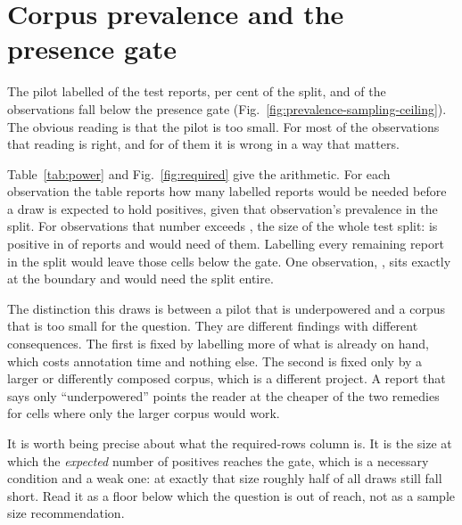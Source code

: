 \section{Corpus prevalence and the presence gate}

The pilot labelled \NCohort{} of the \NTest{} test reports, \CoveragePct{} per
cent of the split, and \NUnderpowered{} of the \NFindings{} observations fall
below the presence gate (Fig.~\ref{fig:prevalence-sampling-ceiling}). The
obvious reading is that the pilot is too small. For most of the observations
that reading is right, and for \NExceedSplit{} of them it is wrong in a way
that matters.

Table~\ref{tab:power} and Fig.~\ref{fig:required} give the arithmetic. For each
observation the table reports how many labelled reports would be needed before
a draw is expected to hold \MinPresent{} positives, given that observation's
prevalence in the split. For \NExceedSplit{} observations that number exceeds
\NTest{}, the size of the whole test split: \RarestFinding{} is positive in
\RarestPresent{} of \NTest{} reports and would need \RarestRequired{} of them.
Labelling every remaining report in the split would leave those cells below
the gate. One observation, \BoundaryFinding{}, sits exactly at the boundary and
would need the split entire.

The distinction this draws is between a pilot that is underpowered and a corpus
that is too small for the question. They are different findings with different
consequences. The first is fixed by labelling more of what is already on hand,
which costs annotation time and nothing else. The second is fixed only by a
larger or differently composed corpus, which is a different project. A report
that says only ``underpowered'' points the reader at the cheaper of the two
remedies for cells where only the larger corpus would work.

It is worth being precise about what the required-rows column is. It is the
size at which the \emph{expected} number of positives reaches the gate, which
is a necessary condition and a weak one: at exactly that size roughly half of
all draws still fall short. Read it as a floor below which the question is out
of reach, not as a sample size recommendation.

\begin{table}[tbp]
\centering
\caption{What the frozen test split of \NTest{} reports contains for each of the
\NFindings{} labelled observations, and what a subsample would need. Rows
needed for the gate is the smallest draw whose expected number of gold
positives reaches \MinPresent{}, computed from that observation's prevalence in
the split; values in bold exceed the size of the split itself, so no subsample
of it can reach the gate. Drawn is the number of gold positives in the
\NCohort{}-report subsample that was actually labelled and Expected is what the
split's prevalence predicts for a draw of that size. Unmentioned counts reports
whose text does not refer to the observation at all, which the labeller
distinguishes from asserting its absence.}
\label{tab:power}
\small

\end{table}

